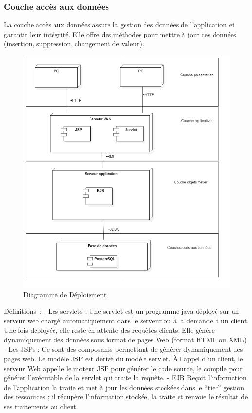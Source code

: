\documentclass[a4paper, title]{report}
\let\oldparagraph\subsubsection
\renewcommand{\subsubsection}[1]{\oldparagraph{#1}\mbox{}}
\begin{document}
\subsubsection{Couche accès aux données}\label{couche-acces-donnees}

La couche accès aux données assure la gestion des données de
l'application et garantit leur intégrité. Elle offre des méthodes pour
mettre à jour ces données (insertion, suppression, changement de
valeur).

\begin{figure}
\centering
\includegraphics{Images/Architecture.png}
\caption{Diagramme de Déploiement}
\end{figure}

Définitions~: - Les servlets : Une servlet est un programme java déployé
sur un serveur web chargé automatiquement dans le serveur ou à la
demande d'un client. Une fois déployée, elle reste en attente des
requêtes clients. Elle génère dynamiquement des données sous format de
pages Web (format HTML ou XML) - Les JSPs : Ce sont des composants
permettant de générer dynamiquement des pages web. Le modèle JSP est
dérivé du modèle servlet. À l'appel d'un client, le serveur Web appelle
le moteur JSP pour générer le code source, le compile pour générer
l'exécutable de la servlet qui traite la requête. - EJB Reçoit
l'information de l'application la traite et met à jour les données
stockées dans le ``tier'' gestion des ressources ; il récupère
l'information stockée, la traite et renvoie le résultat de ses
traitements au client.
\end{document}
